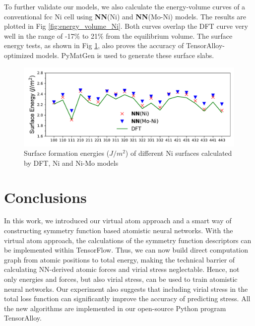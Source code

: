 \documentclass[final,1p,times]{elsarticle}
\begin{document}
To further validate our models, we also calculate the energy-volume curves of a 
conventional fcc Ni cell using \textbf{NN}(Ni) and \textbf{NN}(Mo-Ni) models. 
The results are plotted in Fig \ref{fig:energy_volume_Ni}. Both curves overlap 
the DFT curve very well in the range of -17\% to 21\% from the equilibrium 
volume. The surface energy tests, as shown in Fig \ref{fig:surface_energy_Ni}, 
also proves the accuracy of TensorAlloy-optimized models. 
PyMatGen\cite{pymatgen,pymatgen-1} is used to generate these surface slabs.

% 
%
\begin{figure}[h!]
    \centering
    \includegraphics[scale=0.65]{figures/Ni_surface_energy.pdf}
\caption{\label{fig:surface_energy_Ni} Surface formation energies ($J/m^2$) of 
different Ni surfaces calculated by DFT, Ni and Ni-Mo models}
\end{figure}

% 
%
\section{Conclusions}
\label{section:conclusions}

In this work, we introduced our virtual atom approach and a smart way of 
constructing symmetry function based atomistic neural networks. 
With the virtual atom approach, the calculations of the symmetry function 
descriptors can be implemented within TensorFlow. Thus, we can now build direct 
computation graph from atomic positions to total energy, making the technical 
barrier of calculating NN-derived atomic forces and virial stress neglectable. 
Hence, not only energies and forces, but also virial stress, can be used to 
train atomistic neural networks. Our experiment also suggests that including 
virial stress in the total loss function can significantly improve the accuracy
of predicting stress. All the new algorithms are implemented in our open-source
Python program TensorAlloy.
\end{document}
